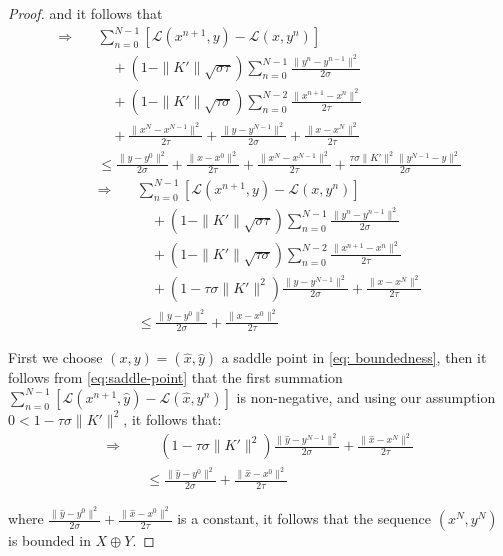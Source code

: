 \documentclass[10pt,a4paper]{amsart}
\begin{document}
\begin{proof}
and it follows that
\[
\begin{aligned}
\Rightarrow\quad
&\sum_{n=0}^{N-1} \left[ \mathcal{L}(x^{n+1},y)- \mathcal{L}(x,y^n) \right] \\
&\quad + (1 - \|K'\|\sqrt{\sigma\tau}) \sum_{n=0}^{N-1} \frac{\|y^n - y^{n-1}\|^2}{2\sigma} \\
&\quad + (1 - \|K'\|\sqrt{\tau\sigma}) \sum_{n=0}^{N-2} \frac{\|x^{n+1} - x^n\|^2}{2\tau} \\
&\quad + \frac{\|x^N - x^{N-1}\|^2}{2\tau} + \frac{\|y - y^{N-1}\|^2}{2\sigma} + \frac{\|x - x^N\|^2}{2\tau} \\
&\leq \frac{\|y - y^{0}\|^2}{2\sigma} + \frac{\|x - x^0\|^2}{2\tau} + \frac{\|x^N - x^{N-1}\|^2}{2\tau} + \frac{\tau\sigma\|K'\|^2\|y^{N-1} - y\|^2}{2\sigma}
\end{aligned}
\]
%
\begin{equation}
\label{eq: boundedness}
\begin{aligned}
\Rightarrow\quad
&\sum_{n=0}^{N-1} \left[ \mathcal{L}(x^{n+1},y)- \mathcal{L}(x,y^n) \right] \\
&\quad + (1 - \|K'\|\sqrt{\sigma\tau}) \sum_{n=0}^{N-1} \frac{\|y^n - y^{n-1}\|^2}{2\sigma} \\
&\quad + (1 - \|K'\|\sqrt{\tau\sigma}) \sum_{n=0}^{N-2} \frac{\|x^{n+1} - x^n\|^2}{2\tau} \\
&\quad + (1 - \tau\sigma\|K'\|^2) \frac{\|y - y^{N-1}\|^2}{2\sigma} + \frac{\|x - x^N\|^2}{2\tau} \\
&\leq \frac{\|y - y^{0}\|^2}{2\sigma} + \frac{\|x - x^0\|^2}{2\tau}
\end{aligned}
\end{equation}


First we choose \((x,y) = (\hat{x},\hat{y})\) a saddle point in \eqref{eq: boundedness}, then it follows from \eqref{eq:saddle-point} that the first summation \(\sum_{n=0}^{N-1} \left[ \mathcal{L}(x^{n+1},\hat{y})- \mathcal{L}(\hat{x},y^n) \right]\) is non-negative, and using our assumption \(0 <1-\tau\sigma\|K'\|^2\), it follows that:
\[
\begin{aligned}
\Rightarrow\quad
&\quad  (1 - \tau\sigma\|K'\|^2) \frac{\|\hat{y} - y^{N-1}\|^2}{2\sigma} + \frac{\|\hat{x} - x^N\|^2}{2\tau} \\
&\leq \frac{\|\hat{y} - y^{0}\|^2}{2\sigma} + \frac{\|\hat{x} - x^0\|^2}{2\tau}
\end{aligned}
\]

where \(\frac{\|\hat{y} - y^{0}\|^2}{2\sigma} + \frac{\|\hat{x} - x^0\|^2}{2\tau}\) is a constant, it follows that the sequence \((x^N,y^N)\) is bounded in \(X \oplus Y\).


\end{proof}
\end{document}
